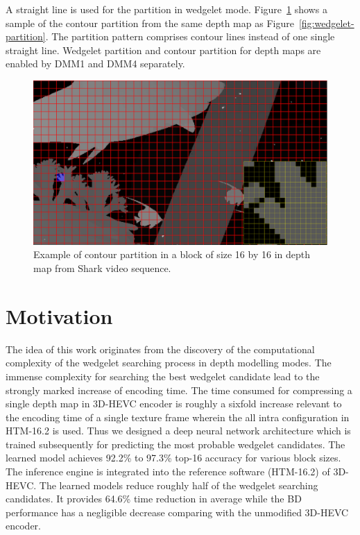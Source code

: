 A straight line is used for the partition in wedgelet mode.
Figure~\ref{fig:contour-partition} shows a sample of the contour partition
from the same depth map as Figure~\ref{fig:wedgelet-partition}.
The partition pattern comprises contour lines instead of one single
straight line.
Wedgelet partition and contour partition for depth maps
are enabled by DMM1 and DMM4 separately.
\begin{figure}
    \centering
    \includegraphics[width=\textwidth,height=\textheight,keepaspectratio]{Figures/contour}
    \caption[Contour partition illustration]
    {Example of contour partition in a block of size 16 by 16 in depth map
    from Shark video sequence.
    }\label{fig:contour-partition}
\end{figure}


\section{Motivation}\label{sec:motivation_and_contribution}
The idea of this work originates from the discovery of the computational
complexity of the wedgelet searching process in depth modelling modes.
The immense complexity for searching the best wedgelet candidate lead to
the strongly marked increase of encoding time.
The time consumed for compressing a single depth map in 3D-HEVC encoder is
roughly a sixfold increase relevant to the encoding time of a single texture
frame wherein the all intra configuration in HTM-16.2 is used.
Thus we designed a deep neural network architecture which is trained
subsequently for predicting the most probable wedgelet candidates.
The learned model achieves 92.2\% to 97.3\% top-16 accuracy for various
block sizes.
The inference engine is integrated into the reference software
(HTM-16.2) of 3D-HEVC\@.
The learned models reduce roughly half of the wedgelet searching candidates.
It provides 64.6\% time reduction in average while the BD performance
has a negligible decrease comparing with the unmodified 3D-HEVC encoder.

